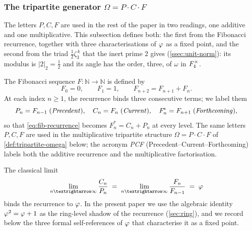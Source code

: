 \subsubsection{The tripartite generator $\Omega = P\cdot C\cdot F$}
\label{ssec:tripartite}



The letters $P, C, F$ are used in the rest of the paper in two readings, one additive and one
multiplicative.  This subsection defines both: the first from the Fibonacci recurrence, together
with three characterisations of $\varphi$ as a fixed point, and the second from the triad
$\tfrac12\zeta_3^{\,k}$ that the inert prime $2$ gives (\cref{ssec:unit-norm}): its modulus is $|2|_2=\tfrac12$ and
its angle has the order, three, of $\omega$ in $F_4^\times$.

\begin{definition}\label{def:fib-PCF-labels}
The Fibonacci sequence $F\colon\mathbb{N}\to\mathbb{N}$ is defined by
\begin{equation}\label{eq:fib-recurrence}
  F_0 = 0,\qquad F_1 = 1,\qquad F_{n+2} = F_{n+1} + F_n.
\end{equation}
At each index $n\ge 1$, the recurrence binds three consecutive
terms; we label them
\begin{equation}\label{eq:PCF-labels}
  P_n = F_{n-1}\;\text{(\emph{Precedent})},\quad
  C_n = F_{n}\;\text{(\emph{Current})},\quad
  F_n^{\!*} = F_{n+1}\;\text{(\emph{Forthcoming})},
\end{equation}
so that \cref{eq:fib-recurrence} becomes
$F_n^{\!*} = C_n + P_n$ at every level.  The same letters
$P, C, F$ are used in the multiplicative tripartite structure
$\Omega = P\cdot C\cdot F$ of \cref{def:tripartite-omega} below; the
acronym \emph{PCF} (Precedent--Current--Forthcoming) labels both
the additive recurrence and the multiplicative factorisation.
\end{definition}

\begin{remark}\label{rmk:fib-ratio-phi}
The classical limit
\[
  \lim_{n\to\infty}\frac{C_n}{P_n}
  \;=\;\lim_{n\to\infty}\frac{F_n}{F_{n-1}}
  \;=\;\golden
\]
binds the recurrence to $\varphi$.  In the present paper we use
the algebraic identity $\varphi^2 = \varphi + 1$ as the
ring-level shadow of the recurrence (\cref{sec:ring}), and we
record below the three formal self-references of $\varphi$ that
characterise it as a fixed point.
\end{remark}

